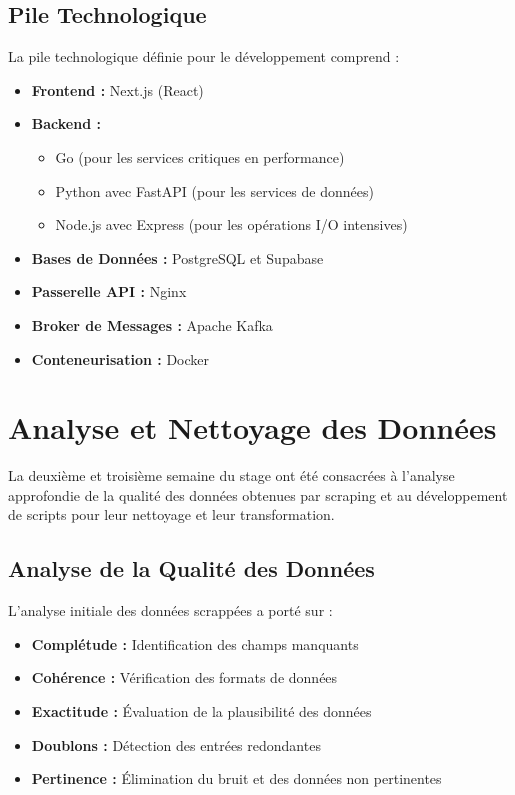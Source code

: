 \documentclass[12pt, a4paper]{report}
\begin{document}
\section{Pile Technologique}
La pile technologique définie pour le développement comprend :
\begin{itemize}
  \item \textbf{Frontend :} Next.js (React)
  \item \textbf{Backend :}
    \begin{itemize}
      \item Go (pour les services critiques en performance)
      \item Python avec FastAPI (pour les services de données)
      \item Node.js avec Express (pour les opérations I/O intensives)
    \end{itemize}
  \item \textbf{Bases de Données :} PostgreSQL et Supabase
  \item \textbf{Passerelle API :} Nginx
  \item \textbf{Broker de Messages :} Apache Kafka
  \item \textbf{Conteneurisation :} Docker
\end{itemize}

\chapter{Analyse et Nettoyage des Données}
\thispagestyle{fancy}

La deuxième et troisième semaine du stage ont été consacrées à l'analyse approfondie de la qualité des données obtenues par scraping et au développement de scripts pour leur nettoyage et leur transformation.

\section{Analyse de la Qualité des Données}
L'analyse initiale des données scrappées a porté sur :
\begin{itemize}
  \item \textbf{Complétude :} Identification des champs manquants
  \item \textbf{Cohérence :} Vérification des formats de données
  \item \textbf{Exactitude :} Évaluation de la plausibilité des données
  \item \textbf{Doublons :} Détection des entrées redondantes
  \item \textbf{Pertinence :} Élimination du bruit et des données non pertinentes
\end{itemize}
\end{document}
